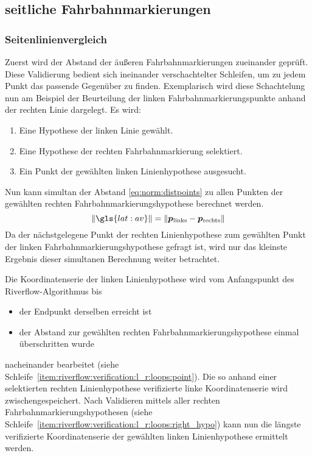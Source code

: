 \subsection{seitliche Fahrbahnmarkierungen \dcsecondauthorshort}

\subsubsection{Seitenlinienvergleich} 
\label{sssec:fahrspurerkennung:riverflow:verifikation:seitenlinienvergleich}
Zuerst wird der Abstand der äußeren Fahrbahnmarkierungen zueinander geprüft. Diese Validierung bedient sich ineinander verschachtelter Schleifen, um zu jedem Punkt das passende Gegenüber zu finden. Exemplarisch wird diese Schachtelung nun am Beispiel der Beurteilung der linken Fahrbahnmarkierungspunkte anhand der rechten Linie dargelegt. Es wird:
\begin{enumerate}
\item 
Eine Hypothese der linken Linie gewählt.
\item \label{item:riverflow:verification:l_r:loops:right_hypo}
Eine Hypothese der rechten Fahrbahnmarkierung selektiert.
\item \label{item:riverflow:verification:l_r:loops:point}
Ein Punkt der gewählten linken Linienhypothese ausgesucht.
\end{enumerate}
Nun kann simultan der Abstand  \eqref{eq:norm:distpoints} 
zu allen Punkten der gewählten rechten Fahrbahnmarkierungshypothese berechnet werden. 
\begin{equation}
\label{eq:norm:distpoints} 
\nrm{\gls{lat:av}} = \nrm{\pnt{p_{\text{links}}} - \pnt{p_{\text{rechts}}}} 
\end{equation}
Da der nächstgelegene Punkt der rechten Linienhypothese zum gewählten Punkt der linken Fahrbahnmarkierungshypothese gefragt ist, wird nur das kleinste Ergebnis dieser simultanen Berechnung weiter betrachtet.

Die Koordinatenserie der linken Linienhypothese wird vom Anfangspunkt des Riverflow-Algorithmus bis
\begin{itemize}
\item der Endpunkt derselben erreicht ist 
\item der Abstand zur gewählten rechten Fahrbahnmarkierungshypothese einmal überschritten wurde
\end{itemize}
nacheinander bearbeitet (siehe Schleife~\ref{item:riverflow:verification:l_r:loops:point}). Die so anhand einer selektierten rechten Linienhypothese verifizierte linke Koordinatenserie wird zwischengespeichert. 
Nach Validieren mittels aller rechten Fahrbahnmarkierungshypothesen (siehe Schleife~\ref{item:riverflow:verification:l_r:loops:right_hypo}) kann nun die längste verifizierte Koordinatenserie der gewählten linken Linienhypothese ermittelt werden.

